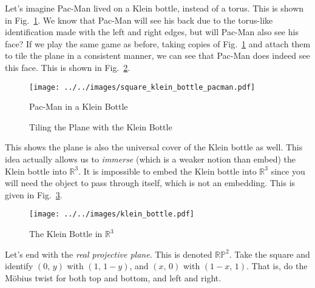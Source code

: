 \documentclass{article}
\theoremstyle{plain}
\theoremstyle{normal}
\begin{document}
        \par\hfill\par
        Let's imagine Pac-Man lived on a Klein bottle, instead of a torus. This
        is shown in Fig.~\ref{fig:square_klein_bottle_pacman}. We know that
        Pac-Man will see his back due to the torus-like identification made with
        the left and right edges, but will Pac-Man also see his face? If we
        play the same game as before, taking copies of
        Fig.~\ref{fig:square_klein_bottle_pacman} and attach them to tile the
        plane in a consistent manner, we can see that Pac-Man does indeed see
        this face. This is shown in Fig.~\ref{fig:plane_klein_bottle_pacman}.
        \begin{figure}
            \centering
            \texttt{[image: ../../images/square\_klein\_bottle\_pacman.pdf]}
            \caption{Pac-Man in a Klein Bottle}
            \label{fig:square_klein_bottle_pacman}
        \end{figure}
        \begin{figure}
            \centering
            \caption{Tiling the Plane with the Klein Bottle}
            \label{fig:plane_klein_bottle_pacman}
        \end{figure}
        \par\hfill\par
        This shows the plane is also the universal cover of the Klein bottle
        as well. This idea actually allows us to \textit{immerse} (which is a
        weaker notion than embed) the Klein bottle into $\mathbb{R}^{3}$.
        It is impossible to embed the Klein bottle into $\mathbb{R}^{3}$ since
        you will need the object to pass through itself, which is not an
        embedding. This is given in Fig.~\ref{fig:klein_bottle}.
        \begin{figure}
            \centering
            \texttt{[image: ../../images/klein\_bottle.pdf]}
            \caption{The Klein Bottle in $\mathbb{R}^{3}$}
            \label{fig:klein_bottle}
        \end{figure}
        \par\hfill\par
        Let's end with the \textit{real projective plane}. This is denoted
        $\mathbb{RP}^{2}$. Take the square and identify
        $(0,\,y)$ with $(1,\,1-y)$, and $(x,\,0)$ with $(1-x,\,1)$. That is,
        do the M\"{o}bius twist for both top and bottom, and left and right.
\end{document}
